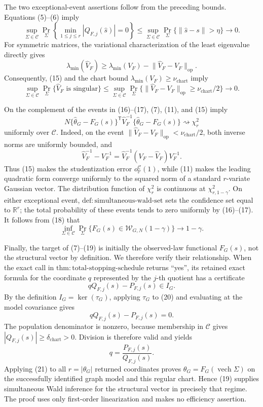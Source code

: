 The two exceptional-event assertions follow from the preceding bounds.  Equations (5)--(6) imply
\[
 \sup_{\Sigma\in\mathcal C}
 \Pr_{\Sigma}\!\left\{\min_{1\le j\le r}|Q_{F,j}(\widehat s)|=0\right\}
 \le
 \sup_{\Sigma\in\mathcal C}\Pr_{\Sigma}\{\lVert\widehat s-s\rVert>\eta\}
 \longrightarrow0.
\tag{16}
\]
For symmetric matrices, the variational characterization of the least eigenvalue directly gives
\[
 \lambda_{\min}(\widehat V_F)
 \ge\lambda_{\min}(V_F)-\lVert\widehat V_F-V_F\rVert_{\mathrm{op}}.
\]
Consequently, (15) and the chart bound \(\lambda_{\min}(V_F)\ge\nu_{\mathrm{chart}}\) imply
\[
 \sup_{\Sigma\in\mathcal C}\Pr_{\Sigma}\{\widehat V_F\text{ is singular}\}
 \le
 \sup_{\Sigma\in\mathcal C}
 \Pr_{\Sigma}\{\lVert\widehat V_F-V_F\rVert_{\mathrm{op}}\ge\nu_{\mathrm{chart}}/2\}
 \longrightarrow0.
\tag{17}
\]

On the complement of the events in (16)--(17), (7), (11), and (15) imply
\[
 N\{\widehat\theta_G-F_G(s)\}^{\mathsf T}\widehat V_F^{-1}
 \{\widehat\theta_G-F_G(s)\}
 \rightsquigarrow\chi_r^2
\tag{18}
\]
uniformly over \(\mathcal C\).  Indeed, on the event
\(\lVert\widehat V_F-V_F\rVert_{\mathrm{op}}<\nu_{\mathrm{chart}}/2\), both inverse norms are uniformly bounded, and
\[
 \widehat V_F^{-1}-V_F^{-1}
 =\widehat V_F^{-1}(V_F-\widehat V_F)V_F^{-1}.
\]
Thus (15) makes the studentization error \(o_{\mathbb P}^{\mathcal C}(1)\), while (11) makes the leading quadratic form converge uniformly to the squared norm of a standard \(r\)-variate Gaussian vector.  The distribution function of \(\chi_r^2\) is continuous at \(\chi^2_{r,1-\gamma}\).  On either exceptional event, \(\mathrm{def:simultaneous\mbox{-}wald\mbox{-}set}\) sets the confidence set equal to \(\mathbb R^r\); the total probability of these events tends to zero uniformly by (16)--(17).  It follows from (18) that
\[
 \inf_{\Sigma\in\mathcal C}
 \Pr_{\Sigma}\{F_G(s)\in\mathcal W_{G,N}(1-\gamma)\}
 \longrightarrow1-\gamma.
\tag{19}
\]

Finally, the target of (7)--(19) is initially the observed-law functional \(F_G(s)\), not the structural vector by definition.  We therefore verify their relationship.  When the exact call in \(\mathrm{thm:total\mbox{-}stopping\mbox{-}schedule}\) returns ``yes'', its retained exact formula for the coordinate \(q\) represented by the \(j\)-th quotient has a certificate
\[
 qQ_{F,j}(s)-P_{F,j}(s)\in I_G.
\tag{20}
\]
By the definition \(I_G=\ker(\tau_G)\), applying \(\tau_G\) to (20) and evaluating at the model covariance gives
\[
 qQ_{F,j}(s)-P_{F,j}(s)=0.
\]
The population denominator is nonzero, because membership in \(\mathcal C\) gives
\(|Q_{F,j}(s)|\ge\delta_{\mathrm{chart}}>0\).  Division is therefore valid and yields
\[
 q=\frac{P_{F,j}(s)}{Q_{F,j}(s)}.
\tag{21}
\]
Applying (21) to all \(r=|\theta_G|\) returned coordinates proves
\(\theta_G=F_G(\operatorname{vech}\Sigma)\) on the successfully identified graph model and this regular chart.  Hence (19) supplies simultaneous Wald inference for the structural vector in precisely that regime.  The proof uses only first-order linearization and makes no efficiency assertion.
